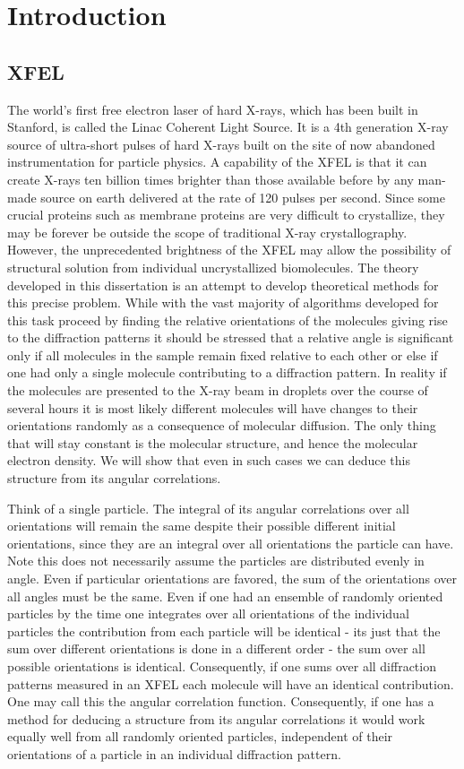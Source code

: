 \clearpage
{}
\chapter{Introduction}
\section{XFEL}
The world’s first free electron laser of hard X-rays, which has been built in Stanford, is called the Linac Coherent Light Source. It is a 4th generation X-ray source of ultra-short pulses of hard X-rays \cite{LCLS} built on the site of now abandoned instrumentation for particle physics. A capability of the XFEL is that it can create X-rays ten billion times brighter than those available before by any man-made source on earth delivered at the rate of 120 pulses per second. Since some crucial proteins such as membrane proteins are very difficult to crystallize, they may be forever be outside the scope of traditional X-ray crystallography. However, the unprecedented brightness of the XFEL may allow the possibility of structural solution from individual uncrystallized biomolecules. The theory developed in this dissertation is an attempt to develop theoretical methods for this precise problem. While with the vast majority of algorithms developed for this task proceed by finding the relative orientations of the molecules giving rise to the diffraction patterns it should be stressed that a relative angle is significant only if all molecules in the sample remain fixed relative to each other or else if one had only a single molecule contributing to a diffraction pattern. In reality if the molecules are presented to the X-ray beam in droplets over the course of several hours it is most likely different molecules will have changes to their orientations randomly as a consequence of molecular diffusion. The only thing that will stay constant is the molecular structure, and hence the molecular electron density. We will show that even in such cases we can deduce this structure from its angular correlations.

Think of a single particle. The integral of its angular correlations over all orientations will remain the same despite their possible different initial orientations, since they are an integral over all orientations the particle can have. Note this does not necessarily assume the particles are distributed evenly in angle. Even if particular orientations are favored, the sum of the orientations over all angles must be the same. Even if one had an ensemble of randomly oriented particles by the time one integrates over all orientations of the individual particles the contribution from each particle will be identical - its just that the sum over different orientations is done in a different order - the sum over all possible orientations is identical. Consequently, if one sums over all diffraction patterns measured in an XFEL each molecule will have an identical contribution. One may call this the angular correlation function. Consequently, if one has a method for deducing a structure from its angular correlations it would work equally well from all randomly oriented particles, independent of their orientations of a particle in an individual diffraction pattern.

